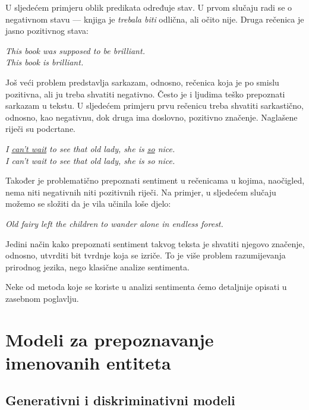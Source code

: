 \documentclass[a4paper,twoside,12pt]{memoir} %
\newcommand{\ti}[1]{\textit{#1\/}}
\begin{document}
	U sljedećem primjeru oblik predikata određuje stav. U prvom slučaju radi se o negativnom stavu --- knjiga je \ti{trebala biti} odlična, ali očito nije. Druga rečenica je jasno pozitivnog stava:
	\begin{displayquote}
		\ti{This book was supposed to be brilliant.}\\
		\ti{This book is brilliant.}
	\end{displayquote}

	Još veći problem predstavlja sarkazam, odnosno, rečenica koja je po smislu pozitivna, ali ju treba shvatiti negativno. Često je i ljudima teško prepoznati sarkazam u tekstu. U sljedećem primjeru prvu rečenicu treba shvatiti sarkastično, odnosno, kao negativnu, dok druga ima doslovno, pozitivno značenje. Naglašene riječi su podcrtane.
	\begin{displayquote}
		\ti{I \underline{can't wait} to see that old lady, she is \underline{so} nice.}\\
		\ti{I can't wait to see that old lady, she is so nice.}
	\end{displayquote}

	Također je problematično prepoznati sentiment u rečenicama u kojima, nao\-či\-gled, nema niti negativnih niti pozitivnih riječi. Na primjer, u sljedećem slučaju možemo se složiti da je vila učinila loše djelo:
	\begin{displayquote}
		\ti{Old fairy left the children to wander alone in endless forest.}
	\end{displayquote}

	Jedini način kako prepoznati sentiment takvog teksta je shvatiti njegovo zna\-če\-nje, odnosno, utvrditi bit tvrdnje koja se izriče. To je više problem razumijevanja prirodnog jezika, nego klasične analize sentimenta.

	\bigskip

	Neke od metoda koje se koriste u analizi sentimenta ćemo detaljnije opisati u zasebnom poglavlju.


	\chapter{Modeli za prepoznavanje imenovanih entiteta}


	\section{Generativni i diskriminativni modeli}
\end{document}
